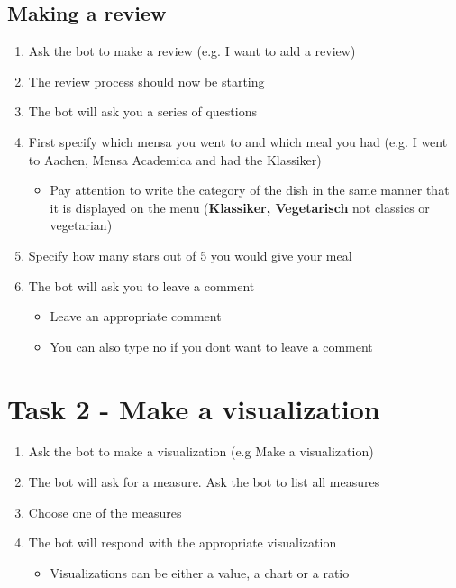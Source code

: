 \subsection*{Making a review}
\begin{enumerate}
    \item Ask the bot to make a review (e.g. I want to add a review)
    \item The review process should now be starting 
    \item The bot will ask you a series of questions
    \item First specify which mensa you went to and which meal you had (e.g. I went to Aachen, Mensa Academica and had the Klassiker) 
    \begin{itemize}
      \item Pay attention to write the category of the dish in the same manner that it is displayed on the menu (\textbf{Klassiker, Vegetarisch} not classics or vegetarian)
    \end{itemize}
    \item Specify how many stars out of 5 you would give your meal
    \item The bot will ask you to leave a comment
    \begin{itemize}
        \item Leave an appropriate comment
        \item You can also type no if you dont want to leave a comment
      \end{itemize}
\end{enumerate}

\section*{Task 2 - Make a visualization}

\begin{enumerate}
    \item Ask the bot to make a visualization (e.g Make a visualization)
    \item The bot will ask for a measure. Ask the bot to list all measures
    \item Choose one of the measures 
    \item The bot will respond with the appropriate visualization
    \begin{itemize}
        \item Visualizations can be either a value, a chart or a ratio
    \end{itemize}
\end{enumerate}


